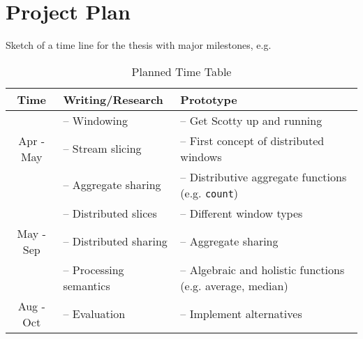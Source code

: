 \section{Project Plan}
\label{sec:plan}

Sketch of a time line for the thesis with major milestones, e.g.

\begin{table}[h!]
    \centering
    \begin{tabular}{ | c | m{} | m{} | }
        \hline
        \textbf{Time} & \textbf{Writing/Research} & \textbf{Prototype} \\
        \hline
                  & -- Windowing         & -- Get Scotty up and running\\
        Apr - May & -- Stream slicing    & -- First concept of distributed windows\\
                  & -- Aggregate sharing & -- Distributive aggregate functions (e.g. \texttt{count})\\
        \hline
                  & -- Distributed slices   & -- Different window types\\
        May - Sep & -- Distributed sharing  & -- Aggregate sharing\\
                  & -- Processing semantics & -- Algebraic and holistic functions (e.g. average, median)\\
        \hline
        Aug - Oct & -- Evaluation & -- Implement alternatives \\
        \hline
    \end{tabular}
    \caption{Planned Time Table}
    \label{tab:time-table}
\end{table}
